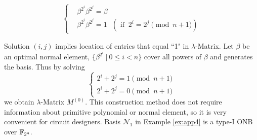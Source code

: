 $$
\begin{cases}
&\beta^{2^i}\beta^{2^j} = \beta\\
&\beta^{2^i}\beta^{2^j} = 1 ~~~(\text{ if }~  2^i = 2^j\pmod{n+1})
\end{cases}$$

Solution $(i,j)$ implies location of entries that equal ``1" in $\lambda$-Matrix. 
Let $\beta$ be an optimal normal element, 
$\{\beta^{2^i}~|~0\leq i<n\}$ cover all powers of $\beta$ and generates the basis. Thus by solving
$$\begin{cases}
2^i + 2^j = 1 \pmod{n+1}\\
2^i + 2^j = 0 \pmod{n+1}
\end{cases}$$
we obtain $\lambda$-Matrix $M^{(0)}$. This construction method does not require information about 
primitive polynomial or normal element, so it is very convenient for circuit designers.
Basis $\mathcal N_1$ in Example \ref{ex:app4} is a type-I ONB over ${\mathbb{F}}_{2^4}$.

